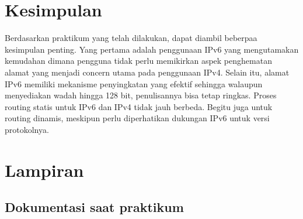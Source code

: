 \section{Kesimpulan}
Berdasarkan praktikum yang telah dilakukan, dapat diambil beberpaa kesimpulan penting. Yang pertama adalah penggunaan IPv6 yang mengutamakan kemudahan dimana pengguna tidak perlu memikirkan aspek penghematan alamat yang menjadi concern utama pada penggunaan IPv4. Selain itu, alamat IPv6 memiliki mekanisme penyingkatan yang efektif sehingga walaupun menyediakan wadah hingga 128 bit, penulisannya bisa tetap ringkas. Proses routing statis untuk IPv6 dan IPv4 tidak jauh berbeda. Begitu juga untuk routing dinamis, meskipun perlu diperhatikan dukungan IPv6 untuk versi protokolnya.

\section{Lampiran}
\subsection{Dokumentasi saat praktikum}

